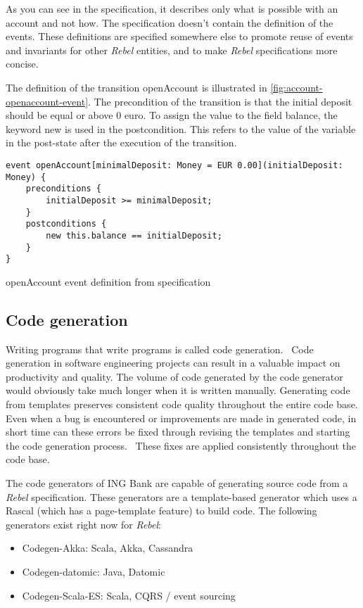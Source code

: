 As you can see in the specification, it describes only what is possible with an account and not how. The specification doesn't contain the definition of the events. These definitions are specified somewhere else to promote reuse of events and invariants for other \textit{Rebel} entities, and to make \textit{Rebel} specifications more concise.~\cite[p.~4]{stoel_storm_vinju_bosman_2016}

The definition of the transition openAccount is illustrated in \autoref{fig:account-openaccount-event}. The precondition of the transition is that the initial deposit should be equal or above 0 euro. To assign the value to the field balance, the keyword new is used in the postcondition. This refers to the value of the variable in the post-state after the execution of the transition.~\cite[p.~4]{stoel_storm_vinju_bosman_2016}

\begin{sourcecode}[h]
\begin{lstlisting}[]
event openAccount[minimalDeposit: Money = EUR 0.00](initialDeposit: Money) {
	preconditions {
		initialDeposit >= minimalDeposit;
	}
	postconditions {
		new this.balance == initialDeposit;
	}
}
\end{lstlisting}
\caption{openAccount event definition from specification}
\label{fig:account-openaccount-event}
\end{sourcecode}

\subsection{Code generation}

Writing programs that write programs is called code generation.~\cite[p.~3]{herrington2003code} Code generation in software engineering projects can result in a valuable impact on productivity and quality. The volume of code generated by the code generator would obviously take much longer when it is written manually. Generating code from templates preserves consistent code quality throughout the entire code base. Even when a bug is encountered or improvements are made in generated code, in short time can these errors be fixed through revising the templates and starting the code generation process.~\cite[p.~15-17]{herrington2003code} These fixes are applied consistently throughout the code base. 

The code generators of ING Bank are capable of generating source code from a \textit{Rebel} specification. These generators are a template-based generator which uses a Rascal (which has a page-template feature)\cite{RascalGTTSE} to build code. The following generators exist right now for \textit{Rebel}:
\begin{itemize}
\item Codegen-Akka: Scala, Akka, Cassandra
\item Codegen-datomic: Java, Datomic
\item Codegen-Scala-ES: Scala, CQRS / event sourcing
\end{itemize}

